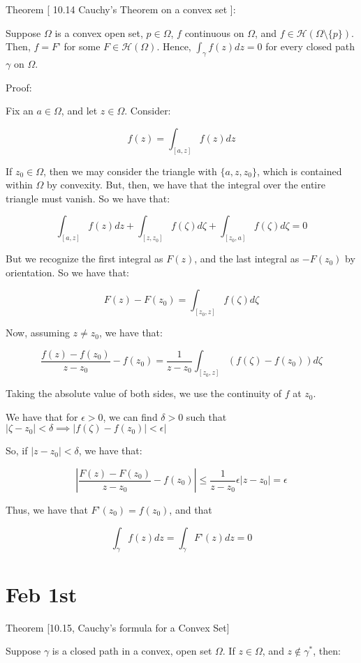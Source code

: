\documentclass[10pt]{article}
\begin{document}
Theorem [ 10.14 Cauchy’s Theorem on a convex set ]:

Suppose $\Omega$ is a convex open set, $p \in \Omega$, $f$ continuous on $\Omega$, and $f \in \mathcal{H}(\Omega \setminus \{ p \})$. Then, $f = F’$ for some $F \in \mathcal{H}(\Omega)$. Hence, $\int_\gamma f(z) dz = 0$ for every closed path $\gamma$ on $\Omega$. 

Proof:

Fix an $a \in \Omega$, and let $z \in \Omega$. Consider:

$$ f(z) = \int_{[a,z]} f(z) dz$$

If $z_0 \in \Omega$, then we may consider the triangle with $\{ a, z, z_0 \}$, which is contained within $\Omega$ by convexity. But, then, we have that the integral over the entire triangle must vanish. So we have that:

$$ \int_{[a,z]} f(z) dz + \int_{[z,z_0]} f(\zeta) d\zeta + \int_{[z_0, a]} f(\zeta) d\zeta = 0$$

But we recognize the first integral as $F(z)$, and the last integral as $-F(z_0)$ by orientation. So we have that:

$$ F(z) - F(z_0) = \int_{[z_0,z]} f(\zeta) d\zeta $$

Now, assuming $z \not = z_0$, we have that:

$$ \frac{f(z) - f(z_0)}{z - z_0} - f(z_0) = \frac{1}{z - z_0} \int_{[z_0,z]} (f(\zeta) - f(z_0)) d\zeta$$

Taking the absolute value of both sides, we use the continuity of $f$ at $z_0$. 

We have that for $\epsilon > 0$, we can find $\delta > 0$ such that $| \zeta - z_0| < \delta \implies | f(\zeta) - f(z_0) | < \epsilon | $

So, if $| z - z_0 | < \delta$, we have that:

$$\left| \frac{F(z) - F(z_0)}{z - z_0} - f(z_0) \right| \leq \frac{1}{z - z_0} \epsilon | z - z_0|  = \epsilon $$

Thus, we have that $F’(z_0) = f(z_0)$, and that

$$ \int_\gamma f(z) dz = \int_\gamma F’(z) dz = 0$$

\section*{Feb 1st}

Theorem [10.15, Cauchy’s formula for a Convex Set]

Suppose $\gamma$ is a closed path in a convex, open set $\Omega$. If $z \in \Omega$, and $z \not \in \gamma^*$, then:
\end{document}
